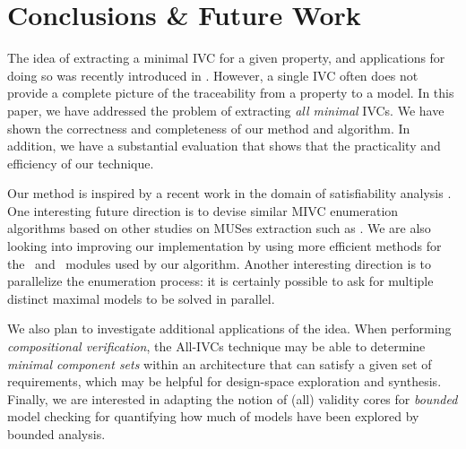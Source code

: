\section{Conclusions \& Future Work}
\label{sec:conc}
The idea of extracting a minimal IVC for a given property, and applications for doing so was recently introduced in \cite{Ghass16}.  However, a single IVC often does not provide a complete picture of the traceability from a property to a model.  In this paper,
we have addressed the problem of extracting {\em all minimal} IVCs. We have shown
the correctness and completeness of our method and algorithm.  In addition, we have a substantial evaluation that shows that the practicality and efficiency of our technique.

Our method is inspired by a recent work in the domain of satisfiability analysis \cite{marco2016fast}. One interesting future direction is to devise similar MIVC enumeration algorithms based on other studies on MUSes extraction such as \cite{nadel2014accelerated}.  We are also looking into improving our implementation by using more  efficient methods for the \isadeq ~and \getivc ~modules used by our algorithm. Another interesting direction is to parallelize the enumeration process: it is certainly possible to ask for multiple distinct maximal models to be solved in parallel.

We also plan to investigate additional applications of the idea.  When performing {\em compositional verification}, the All-IVCs technique may be able to determine {\em minimal component sets} within an architecture that can satisfy a given set of requirements, which may be helpful for design-space exploration and synthesis. Finally, we are interested in adapting the notion of (all) validity cores for \emph{bounded} model checking for quantifying how much of models have been explored by bounded analysis. 
